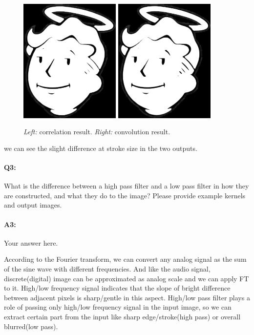 	\begin{figure}[h!]
		\centering
		\includegraphics[width=5cm]{vaultboy_output1.png}
		\includegraphics[width=5cm]{vaultboy_output2.png}
		\caption{\emph{Left:} correlation result. \emph{Right:} convolution result.}
		\label{fig:result1}
	\end{figure}

	we can see the slight difference at stroke size in the two outputs.
	
	\pagebreak
		\paragraph{Q3:} What is the difference between a high pass filter and a low pass filter in how they are constructed, and what they do to the image? Please provide example kernels and output images.
		
	\paragraph{A3:} Your answer here.
	
	According to the Fourier transform, we can convert any analog signal as the sum of the sine wave with different frequencies.
 	And like the audio signal, discrete(digital) image can be approximated as analog scale and we can apply FT to it. 
	High/low frequency signal indicates that the slope of bright difference between adjacent pixels is sharp/gentle in this aspect.
	High/low pass filter plays a role of passing only high/low frequency signal in the input image, so we can extract certain part from the input like sharp edge/stroke(high pass) or overall blurred(low pass).

